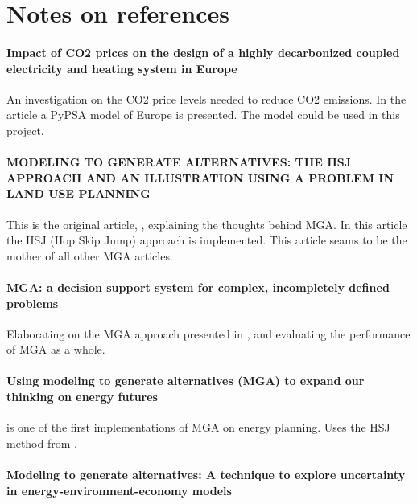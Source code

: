 

\chapter*{Notes on references}

\subsubsection*{Impact of CO2 prices on the design of a highly decarbonized coupled
electricity and heating system in Europe\cite{PypsaModel}}
An investigation on the CO2 price levels needed to reduce CO2 emissions. In the article a PyPSA model of Europe is presented. The model could be used in this project. 

\subsubsection*{MODELING TO GENERATE ALTERNATIVES: THE HSJ
APPROACH AND AN ILLUSTRATION USING A
PROBLEM IN LAND USE PLANNING \cite{Brill_MGA_1982}}

This is the original article, \cite{Brill_MGA_1982}, explaining the thoughts behind MGA. In this article the HSJ (Hop Skip Jump) approach is implemented. This article seams to be the mother of all other MGA articles. 

\subsubsection*{MGA: a decision support system for complex, incompletely defined problems\cite{Brill_MGA_1990}}
Elaborating on the MGA approach presented in \cite{Brill_MGA_1982}, and evaluating the performance of MGA as a whole. 

\subsubsection*{Using modeling to generate alternatives (MGA) to expand our thinking on
energy futures\cite{DeCarolis_MGA}}

\cite{DeCarolis_MGA} is one of the first implementations of MGA on energy planning. Uses the HSJ method from \cite{Brill_MGA_1982}.

\subsubsection*{Modeling to generate alternatives: A technique to explore uncertainty
in energy-environment-economy models \cite{MGA}}

